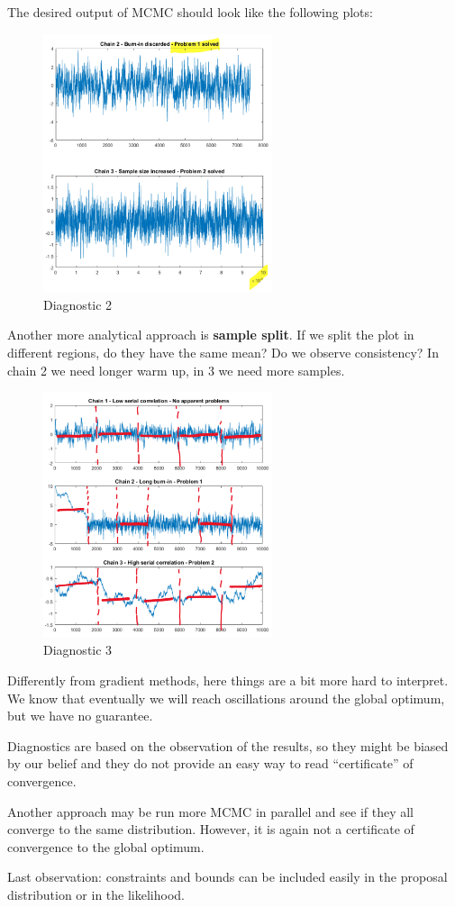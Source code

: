 The desired output of MCMC should look like the following plots:

\begin{figure}
\centering
\includegraphics[width=0.6\textwidth]{diag_2.png}
\caption{Diagnostic 2}
\end{figure}

Another more analytical approach is \textbf{sample split}. If we split
the plot in different regions, do they have the same mean? Do we observe
consistency? In chain 2 we need longer warm up, in 3 we need more
samples.

\begin{figure}
\centering
\includegraphics[width=0.6\textwidth]{diag_3.png}
\caption{Diagnostic 3}
\end{figure}

Differently from gradient methods, here things are a bit more hard to
interpret. We know that eventually we will reach oscillations around the
global optimum, but we have no guarantee.

Diagnostics are based on the observation of the results, so they might
be biased by our belief and they do not provide an easy way to read
``certificate'' of convergence.

Another approach may be run more MCMC in parallel and see if they all
converge to the same distribution. However, it is again not a
certificate of convergence to the global optimum.

Last observation: constraints and bounds can be included easily in the
proposal distribution or in the likelihood.


